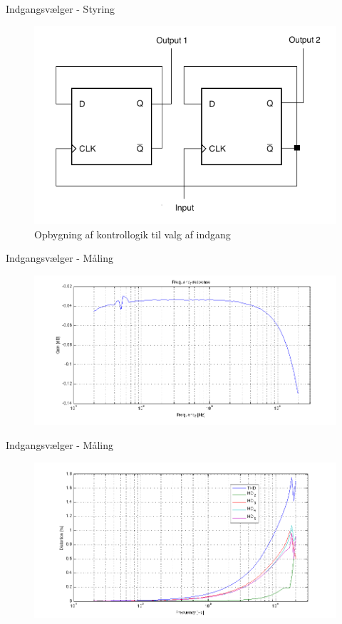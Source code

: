 \begin{frame}{Indgangsvælger - Styring}

\begin{figure}[h]
\centering
\includegraphics[scale=0.4]{../rapport/teknisk/indgangsvaelger/flipflop.png}
\caption{Opbygning af kontrollogik til valg af indgang}
\label{fig:indgangsvaelger-flipflop}
\end{figure}
\end{frame}

\begin{frame}{Indgangsvælger - Måling}
\begin{figure}[h]
\centering
\includegraphics[width=\textwidth]{../rapport/maalerapporter/indgangsvaelger/Indgangsvlger-mic-200mv-frek.png}
\label{fig:indacc:frek200mv}
\end{figure}
\end{frame}

\begin{frame}{Indgangsvælger - Måling}
\begin{figure}[h]
\centering
\includegraphics[width=\textwidth]{../rapport/maalerapporter/indgangsvaelger/Indgangsvlger-mic-2v-thd.png}
\label{fig:accind:thd2v}
\end{figure}
\end{frame}

